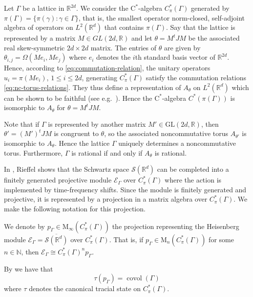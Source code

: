 \documentclass[reqno, a4paper]{amsart}
\numberwithin{equation}{section}
\newcommand{\N}{\mathbb{N}}   %
\newcommand{\R}{\mathbb{R}}   %
\newcommand{\ca}{$\mathrm{C}^*$-algebra}
\DeclareMathOperator{\covol}{covol}
\begin{document}
Let $\Gamma$ be a lattice in $\R^{2d}$. We consider the \ca{} $C_\pi^*(\Gamma)$ generated by $\pi(\Gamma) = \{ \pi(\gamma) : \gamma \in \Gamma \}$, that is, the smallest operator norm-closed, self-adjoint algebra of operators on $L^2(\R^d)$ that contains $\pi(\Gamma)$. 
Say that the lattice is represented by a matrix $M \in GL(2d,\R)$ and let $\theta = M^t J M$ be the associated real skew-symmetric $2d \times 2d$ matrix. 
The entries of $\theta$ are given by $\theta_{i,j} = \Omega(Me_i,Me_j)$ where $e_i$ denotes the $i$th standard basis vector of $\R^{2d}$. 
Hence, according to \eqref{eq:commutation-relation}, the unitary operators $u_i = \pi(Me_i)$, $1 \leq i \leq 2d$, generating $C_\pi^*(\Gamma)$ satisfy the commutation relations \eqref{eq:nc-torus-relations}. 
They thus define a representation of $A_{\theta}$ on $L^2(\R^d)$ which can be shown to be faithful (see e.g.\ \cite[Proposition~2.2]{ri88}).
 Hence the \ca{} $C^*(\pi(\Gamma))$ is isomorphic to $A_\theta$ for $\theta = M^t J M$.

Note that if $\Gamma$ is represented by another matrix $M' \in \mathrm{GL}(2d,\R)$, then $\theta' = (M')^t J M$ is congruent to $\theta$, so the associated noncommutative torus $A_{\theta'}$ is isomorphic to $A_\theta$. Hence the lattice $\Gamma$ uniquely determines a noncommutative torus. Furthermore, $\Gamma$ is rational if and only if $A_\theta$ is rational.

In \cite{ri88}, Rieffel shows that the Schwartz space $\mathcal{S}(\R^d)$ can be completed into a finitely generated projective module $\mathcal{E}_{\Gamma}$ over $C_\pi^*(\Gamma)$ where the action is implemented by time-frequency shifts. Since the module is finitely generated and projective, it is represented by a projection in a matrix algebra over $C_\pi^*(\Gamma)$. We make the following notation for this projection.

\begin{notation}
\label{not:projection}
We denote by $p_\Gamma \in \mathrm{M}_\infty(C_\pi^*(\Gamma))$ the projection representing the Heisenberg module $\mathcal{E}_\Gamma = \overline{\mathcal{S}(\R^d)}$ over $C_\pi^*(\Gamma)$. That is, if $p_\Gamma \in \mathrm{M}_n(C_\pi^*(\Gamma))$ for some $n \in \N$, then $\mathcal{E}_\Gamma \cong C_\pi^*(\Gamma)^n p_\Gamma$.
\end{notation}

By \cite[Theorem~3.4]{ri88} we have that
\begin{equation}
\label{eq:covolume-projection}
\tau(p_\Gamma) = \covol(\Gamma) 
\end{equation}
where $\tau$ denotes the canonical tracial state on $C_\pi^*(\Gamma)$.
\end{document}
